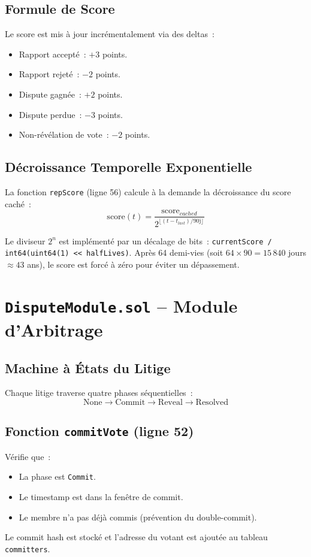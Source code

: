 \documentclass[12pt, a4paper]{report}
\begin{document}
\subsection{Formule de Score}
Le score est mis \`{a} jour incr\'{e}mentalement via des deltas~:
\begin{itemize}
    \item Rapport accept\'{e}~: $+3$ points.
    \item Rapport rejet\'{e}~: $-2$ points.
    \item Dispute gagn\'{e}e~: $+2$ points.
    \item Dispute perdue~: $-3$ points.
    \item Non-r\'{e}v\'{e}lation de vote~: $-2$ points.
\end{itemize}

\subsection{D\'{e}croissance Temporelle Exponentielle}
La fonction \texttt{repScore} (ligne 56) calcule \`{a} la demande la d\'{e}croissance du score cach\'{e}~:
$$\text{score}(t) = \frac{\text{score}_{cached}}{2^{\lfloor (t - t_{last}) / 90\text{j} \rfloor}}$$

Le diviseur $2^n$ est impl\'{e}ment\'{e} par un d\'{e}calage de bits~: \texttt{currentScore / int64(uint64(1) << halfLives)}. Apr\`{e}s 64 demi-vies (soit $64 \times 90 = 15\,840$ jours $\approx 43$ ans), le score est forc\'{e} \`{a} z\'{e}ro pour \'{e}viter un d\'{e}passement.

\section{\texttt{DisputeModule.sol} -- Module d'Arbitrage}

\subsection{Machine \`{a} \'{E}tats du Litige}
Chaque litige traverse quatre phases s\'{e}quentielles~:
$$\text{None} \rightarrow \text{Commit} \rightarrow \text{Reveal} \rightarrow \text{Resolved}$$

\subsection{Fonction \texttt{commitVote} (ligne 52)}
V\'{e}rifie que~:
\begin{itemize}
    \item La phase est \texttt{Commit}.
    \item Le timestamp est dans la fen\^{e}tre de commit.
    \item Le membre n'a pas d\'{e}j\`{a} commis (pr\'{e}vention du double-commit).
\end{itemize}
Le commit hash est stock\'{e} et l'adresse du votant est ajout\'{e}e au tableau \texttt{committers}.
\end{document}
